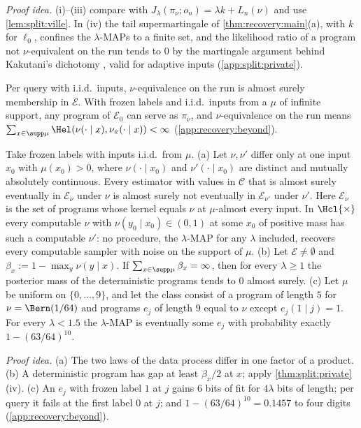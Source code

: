 \emph{Proof idea.} (i)--(iii) compare with $J_\lambda(\pi_\nu;o_n)=\lambda k+L_n(\nu)$ and use \cref{lem:split:ville}. In (iv) the tail supermartingale of \cref{thm:recovery:main}(a), with $k$ for $\ell_0$, confines the $\lambda$-MAPs to a finite set, and the likelihood ratio of a program not $\nu$-equivalent on the run tends to $0$ by the martingale argument behind Kakutani's dichotomy \citep{kakutani1948equivalence}, valid for adaptive inputs (\cref{app:split:private}).

Per query with i.i.d.\ inputs, $\nu$-equivalence on the run is almost surely membership in $\mathcal E$. With frozen labels and i.i.d.\ inputs from a $\mu$ of infinite support, any program of $\mathcal E_0$ can serve as $\pi_\nu$, and $\nu$-equivalence on the run means $\sum_{x\in\supp\mu}\Hel(\nu(\cdot\mid x),\nu_\pi(\cdot\mid x))<\infty$ (\cref{app:recovery:beyond}).

\begin{proposition}\label{prop:recovery:frozen}
Take frozen labels with inputs i.i.d.\ from $\mu$.
(a) Let $\nu,\nu'$ differ only at one input $x_0$ with $\mu(x_0)>0$, where $\nu(\cdot\mid x_0)$ and $\nu'(\cdot\mid x_0)$ are distinct and mutually absolutely continuous. Every estimator with values in $\mathcal C$ that is almost surely eventually in $\mathcal E_\nu$ under $\nu$ is almost surely not eventually in $\mathcal E_{\nu'}$ under $\nu'$. Here $\mathcal E_\nu$ is the set of programs whose kernel equals $\nu$ at $\mu$-almost every input. In $\Hcl{\times}$ every computable $\nu$ with $\nu(y_0\mid x_0)\in(0,1)$ at some $x_0$ of positive mass has such a computable $\nu'$: no procedure, the $\lambda$-MAP for any $\lambda$ included, recovers every computable sampler with noise on the support of $\mu$.
(b) Let $\mathcal E\ne\emptyset$ and $\beta_x:=1-\max_y\nu(y\mid x)$. If $\sum_{x\in\supp\mu}\beta_x=\infty$, then for every $\lambda\ge1$ the posterior mass of the deterministic programs tends to $0$ almost surely.
(c) Let $\mu$ be uniform on $\{0,\dots,9\}$, and let the class consist of a program of length $5$ for $\nu=\Bern(1/64)$ and programs $e_j$ of length $9$ equal to $\nu$ except $e_j(1\mid j)=1$. For every $\lambda<1.5$ the $\lambda$-MAP is eventually some $e_j$ with probability exactly $1-(63/64)^{10}$.
\end{proposition}

\emph{Proof idea.} (a) The two laws of the data process differ in one factor of a product. (b) A deterministic program has gap at least $\beta_x/2$ at $x$; apply \cref{thm:split:private}(iv). (c) An $e_j$ with frozen label $1$ at $j$ gains $6$ bits of fit for $4\lambda$ bits of length; per query it fails at the first label $0$ at $j$; and $1-(63/64)^{10}=0.1457$ to four digits (\cref{app:recovery:beyond}).

